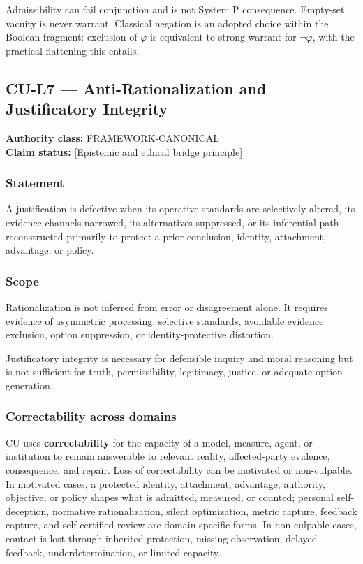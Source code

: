\documentclass[
  11pt,
]{article}
\begin{document}
Admissibility can fail conjunction and is not System P consequence.
Empty-set vacuity is never warrant. Classical negation is an adopted
choice within the Boolean fragment: exclusion of \(\varphi\) is
equivalent to strong warrant for \(\neg\varphi\), with the practical
flattening this entails.

\subsection{CU-L7 --- Anti-Rationalization and Justificatory
Integrity}\label{cu-l7-anti-rationalization-and-justificatory-integrity}

\textbf{Authority class:} FRAMEWORK-CANONICAL\\
\textbf{Claim status:} {[}Epistemic and ethical bridge principle{]}

\subsubsection{Statement}\label{statement-30}

A justification is defective when its operative standards are
selectively altered, its evidence channels narrowed, its alternatives
suppressed, or its inferential path reconstructed primarily to protect a
prior conclusion, identity, attachment, advantage, or policy.

\subsubsection{Scope}\label{scope-14}

Rationalization is not inferred from error or disagreement alone. It
requires evidence of asymmetric processing, selective standards,
avoidable evidence exclusion, option suppression, or identity-protective
distortion.

Justificatory integrity is necessary for defensible inquiry and moral
reasoning but is not sufficient for truth, permissibility, legitimacy,
justice, or adequate option generation.

\subsubsection{Correctability across
domains}\label{correctability-across-domains}

CU uses \textbf{correctability} for the capacity of a model, measure,
agent, or institution to remain answerable to relevant reality,
affected-party evidence, consequence, and repair. Loss of correctability
can be motivated or non-culpable. In motivated cases, a protected
identity, attachment, advantage, authority, objective, or policy shapes
what is admitted, measured, or counted; personal self-deception,
normative rationalization, silent optimization, metric capture, feedback
capture, and self-certified review are domain-specific forms. In
non-culpable cases, contact is lost through inherited protection,
missing observation, delayed feedback, underdetermination, or limited
capacity.
\end{document}
